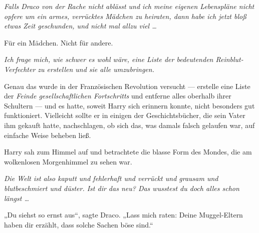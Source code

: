 \emph{Falls Draco von der Rache nicht ablässt und ich meine eigenen Lebenspläne nicht opfere um ein armes, verrücktes Mädchen zu heiraten, dann habe ich jetzt bloß etwas Zeit geschunden, und nicht mal allzu viel …}

Für ein Mädchen. Nicht für andere.

\emph{Ich frage mich, wie schwer es wohl wäre, eine Liste der bedeutenden Reinblut-Verfechter zu erstellen und sie alle umzubringen.}

Genau das wurde in der Französischen Revolution versucht — erstelle eine Liste der \emph{Feinde gesellschaftlichen Fortschritts} und entferne alles oberhalb ihrer Schultern — und es hatte, soweit Harry sich erinnern konnte, nicht besonders gut funktioniert. Vielleicht sollte er in einigen der Geschichtsbücher, die sein Vater ihm gekauft hatte, nachschlagen, ob sich das, was damals falsch gelaufen war, auf einfache Weise beheben ließ.

Harry sah zum Himmel auf und betrachtete die blasse Form des Mondes, die am wolkenlosen Morgenhimmel zu sehen war.

\emph{Die Welt ist also kaputt und fehlerhaft und verrückt und grausam und blutbeschmiert und düster. Ist dir das neu? Das wusstest du doch alles schon längst …}

„Du siehst so ernst aus“, sagte Draco.
„Lass mich raten: Deine Muggel-Eltern haben dir erzählt, dass solche Sachen böse sind.“

